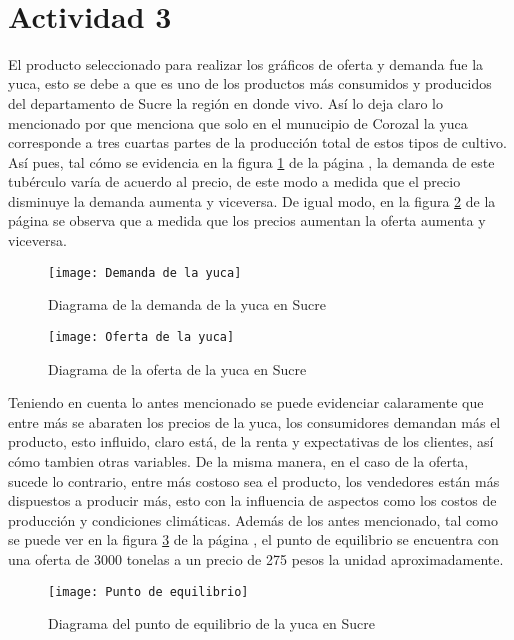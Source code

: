 \justify
\fontsize{12pt}{14}\
\setlength{\parindent}{0cm}

\section{Actividad 3}
\normalsize El producto seleccionado para realizar los gráficos de oferta y demanda fue la yuca, esto se debe a que es uno de los productos más consumidos y producidos del departamento de Sucre la región en donde vivo. Así lo deja claro lo mencionado por \cite{hochschild2024} que menciona que solo en el munucipio de Corozal la yuca corresponde a tres cuartas partes de la producción total de estos tipos de cultivo. Así pues, tal cómo se evidencia en la figura \ref{fig:demanda} de la página \pageref{fig:demanda}, la demanda de este tubérculo varía de acuerdo al precio, de este modo a medida que el precio disminuye la demanda aumenta y viceversa. De igual modo, en la figura \ref{fig:oferta} de la página \pageref{fig:oferta} se observa que a medida que los precios aumentan la oferta aumenta y viceversa.

\begin{figure}[ht!]
    \centering
    \texttt{[image: Demanda de la yuca]}
    \caption{Diagrama de la demanda de la yuca en Sucre}
    \label{fig:demanda}
\end{figure}

\begin{figure}[ht!]
    \centering
    \texttt{[image: Oferta de la yuca]}
    \caption{Diagrama de la oferta de la yuca en Sucre}
    \label{fig:oferta}
\end{figure}

\normalsize Teniendo en cuenta lo antes mencionado se puede evidenciar calaramente que entre más se abaraten los precios de la yuca, los consumidores demandan más el producto, esto influido, claro está, de la renta y expectativas de los clientes, así cómo tambien otras variables. De la misma manera, en el caso de la oferta, sucede lo contrario, entre más costoso sea el producto, los vendedores están más dispuestos a producir más, esto con la influencia de aspectos como los costos de producción y condiciones climáticas. Además de los antes mencionado, tal como se puede ver en la figura \ref{fig:equilibrio} de la página \pageref{fig:equilibrio}, el punto de equilibrio se encuentra con una oferta de 3000 tonelas a un precio de 275 pesos la unidad aproximadamente.

\begin{figure}[ht!]
    \centering
    \texttt{[image: Punto de equilibrio]}
    \caption{Diagrama del punto de equilibrio de la yuca en Sucre}
    \label{fig:equilibrio}
\end{figure}